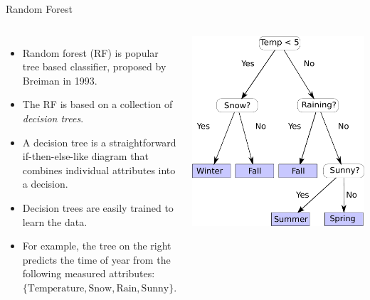 \documentclass[10pt, aspectratio=169]{beamer} %
\begin{document}
\begin{frame}{Random Forest}
\begin{columns}
\begin{itemize}
\item Random forest (RF) is popular tree based classifier, proposed by Breiman in 1993.
\item The RF is based on a collection of \emph{decision trees}.
\item A decision tree is a straightforward if-then-else-like diagram
that combines individual attributes into a decision.
\item Decision trees are easily trained to learn the data.
\item For example, the tree on the right predicts the time of year from the following
measured attributes:
$\{\text{Temperature}, \text{Snow}, \text{Rain}, \text{Sunny}\}$.
\end{itemize}
\centerline{\includegraphics[width=1.2\columnwidth]{DecisionTree.pdf}}
\end{columns}
\end{frame}
\end{document}
